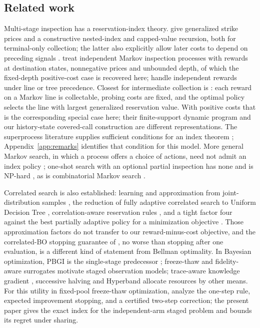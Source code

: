 \subsection{Related work}
\label{sec:related}

Multi-stage inspection has a reservation-index theory. \citet[Appendix~G]{kleinberg2016descending}
give generalized strike prices and \citet[Section~4, Definition~4]{bowers2024nested} a
constructive nested-index and capped-value recursion, both for terminal-only collection;
the latter also explicitly allow later costs to depend on preceding signals
\citep[Section~4.1]{bowers2024nested}.
\citet{gupta2019markovian} treat independent Markov inspection processes with rewards at
destination states, nonnegative prices and unbounded depth, of which the fixed-depth
positive-cost case is recovered here; \citet{boodaghians2023order} handle independent rewards
under line or tree precedence. Closest for intermediate collection is
\citet[Theorem~4.4]{yang2025markovian}: each reward on a Markov line is collectable, probing
costs are fixed, and the optimal policy selects the line with largest generalized reservation
value. With positive costs that is the corresponding special case here; their finite-support
dynamic program and our history-state covered-call construction are different
representations. The superprocess literature supplies sufficient conditions for an index
theorem \citep{whittle1980gittins,glazebrook1982whittle,scully2025gittins};
Appendix~\ref{app:remarks} identifies that condition for this model. More general Markov
search, in which a process offers a choice of actions, need not admit an index policy
\citep{glazebrook1982whittle,scully2025gittins}; one-shot search with an optional partial
inspection has none and is NP-hard \citep{aouad2025sequential}, as is combinatorial Markov
search \citep{bowers2026cms}.

Correlated search is also established: learning and approximation from joint-distribution
samples \citep{chawla2020correlations}, the reduction of fully adaptive correlated search to
Uniform Decision Tree \citep{chawla2023adaptivecorrelations}, correlation-aware reservation
rules \citep{gergatsouli2023weitzman}, and a tight factor four against the best partially
adaptive policy for a minimization objective \citep{bansal2025correlated}. Those approximation
factors do not transfer to our reward-minus-cost objective, and the correlated-BO stopping
guarantee of \citet{xie2025coststop}, no worse than stopping after one evaluation, is a
different kind of statement from Bellman optimality. In Bayesian optimization, PBGI is the
single-stage predecessor \citep{xie2024pbgi}; freeze-thaw and fidelity-aware surrogates
\citep{swersky2014,klein2017fabolas} motivate staged observation models; trace-aware knowledge
gradient \citep{wu2019takg}, successive halving and Hyperband
\citep{jamieson2016sh,li2018hyperband} allocate resources by other means. For this utility in
fixed-pool freeze-thaw optimization, \citet{vu2026coststop} analyze the one-step rule, expected
improvement stopping, and a certified two-step correction; the present paper gives the exact
index for the independent-arm staged problem and bounds its regret under sharing.

